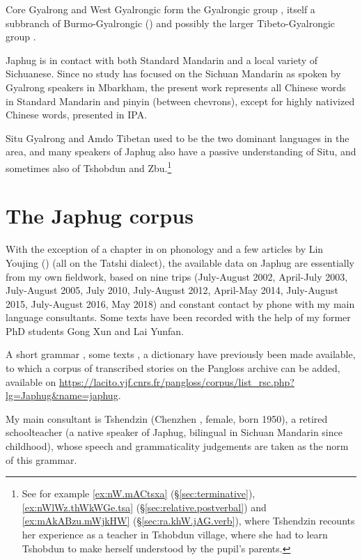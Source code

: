 Core Gyalrong and West Gyalrongic form the Gyalrongic group \citep{jackson00puxi}, itself a subbranch of Burmo-Gyalrongic (\citealt{jacques.michaud11naish}) and possibly  the larger Tibeto-Gyalrongic group \citep{Sagart19ST}.

Japhug is in contact with both Standard Mandarin and a local variety of Sichuanese. Since no study has focused on the Sichuan Mandarin as spoken by Gyalrong speakers in Mbarkham, the present work represents all Chinese words in Standard Mandarin and pinyin (between chevrons), except for highly nativized Chinese words, presented in IPA.

Situ Gyalrong and Amdo Tibetan used to be the two dominant languages in the area, and many speakers of Japhug also have a passive understanding of Situ, and sometimes also of Tshobdun and Zbu.\footnote{See for example \ref{ex:nW.mACtsxa} (§\ref{sec:terminative}), \ref{ex:nWlWz.thWkWGe.tsa} (§\ref{sec:relative.postverbal}) and \ref{ex:mAkABzu.mWjkHW} (§\ref{sec:ra.khW.jAG.verb}), where Tshendzin recounts her experience as a teacher in Tshobdun village, where she had to learn Tshobdun to make herself understood by the pupil's parents. }


 
 \section{The Japhug corpus}
With the exception of a chapter in \citet[468--486]{linxr93jiarong} on phonology and a few articles by Lin Youjing (\citealt{linluo03, lin11direction}) (all on the Tatshi dialect), the available data on Japhug
are essentially from my own fieldwork, based on nine trips (July-August 2002, April-July 2003, July-August 2005, July 2010, July-August 2012, April-May 2014, July-August 2015, July-August 2016, May 2018) and constant contact by phone with my main language consultants. Some texts have been recorded with the help of my former PhD students Gong Xun and Lai Yunfan.
 
A short grammar \citep{jacques08}, some texts \citep{jacques10gesar}, a dictionary \citep{jacques15japhug} have previously been made available, to which a corpus of transcribed stories on the  Pangloss archive \citep{michailovsky14pangloss} can be added, available on \url{https://lacito.vjf.cnrs.fr/pangloss/corpus/list_rsc.php?lg=Japhug&name=japhug}.


My main consultant is Tshendzin (Chenzhen , female, born 1950), a retired schoolteacher (a native speaker of Japhug, bilingual in Sichuan Mandarin since childhood), whose speech and grammaticality judgements are taken as the norm of this grammar. 

